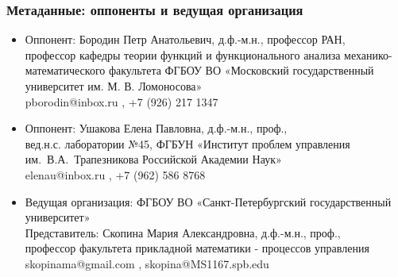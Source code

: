 \begin{frame}\frametitle{Метаданные: оппоненты и ведущая организация}
	\begin{itemize}
		\item
			Оппонент: Бородин Петр Анатольевич, д.ф.-м.н., профессор РАН,
			\\
			профессор кафедры теории функций и функционального анализа механико-математического факультета
			ФГБОУ ВО «Московский государственный университет им. М. В. Ломоносова»
			\\
			pborodin@inbox.ru , +7 (926) 217 1347
		\item
			Оппонент: Ушакова Елена Павловна, д.ф.-м.н., проф.,
			\\
			вед.н.с. лаборатории №45,
			ФГБУН «Институт проблем управления им.~В.А.~Трапезникова Российской Академии Наук»
			\\
			elenau@inbox.ru , +7 (962) 586 8768
		\item
			Ведущая организация:
			ФГБОУ ВО «Санкт-Петербургский государственный университет»
			\\
			Представитель:
			Скопина Мария Александровна, д.ф.-м.н., проф.,
			\\
			профессор факультета прикладной математики - процессов управления
			\\
			skopinama@gmail.com , skopina@MS1167.spb.edu
	\end{itemize}
\end{frame}

